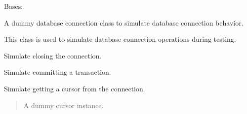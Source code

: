 \documentclass[letterpaper,10pt,english]{sphinxmanual}
\begin{document}
\begin{fulllineitems}
\label{\detokenize{test.data_storage:test.data_storage.test_llm_analyse.DummyConnection}}
\pysigstartsignatures
\pysigline
{}
\pysigstopsignatures
\sphinxAtStartPar
Bases: 

\sphinxAtStartPar
A dummy database connection class to simulate database connection behavior.

\sphinxAtStartPar
This class is used to simulate database connection operations during testing.

\begin{fulllineitems}
\label{\detokenize{test.data_storage:test.data_storage.test_llm_analyse.DummyConnection.close}}
\pysigstartsignatures
\pysiglinewithargsret
{}
{}
{}
\pysigstopsignatures
\sphinxAtStartPar
Simulate closing the connection.

\end{fulllineitems}


\begin{fulllineitems}
\label{\detokenize{test.data_storage:test.data_storage.test_llm_analyse.DummyConnection.commit}}
\pysigstartsignatures
\pysiglinewithargsret
{}
{}
{}
\pysigstopsignatures
\sphinxAtStartPar
Simulate committing a transaction.

\end{fulllineitems}


\begin{fulllineitems}
\label{\detokenize{test.data_storage:test.data_storage.test_llm_analyse.DummyConnection.cursor}}
\pysigstartsignatures
\pysiglinewithargsret
{}
{}
{}
\pysigstopsignatures
\sphinxAtStartPar
Simulate getting a cursor from the connection.
\begin{quote}\begin{description}
\sphinxAtStartPar
A dummy cursor instance.


\end{description}
\end{quote}
\end{fulllineitems}
\end{fulllineitems}
\end{document}
